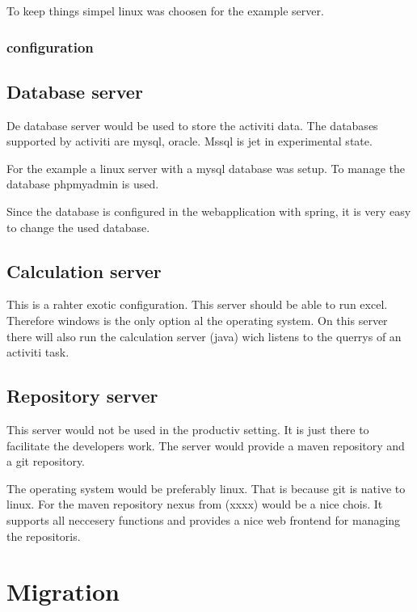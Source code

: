 \documentclass[paper=a4,twoside=false,BCOR=0mm,DIV=calc,fontsize=12pt]{scrartcl}
\begin{document}
To keep things simpel linux was choosen for the example server.

\subsubsection{configuration}


\subsection{Database server}
De database server would be used to store the activiti data. The databases supported by activiti are mysql, oracle. Mssql is jet in experimental state.
 
For the example a linux server with a mysql database was setup.
To manage the database phpmyadmin is used.

Since the database is configured in the webapplication with spring, it is very easy to change the used database.


\subsection{Calculation server}
This is a rahter exotic configuration. This server should be able to run excel. Therefore windows is the only option al the operating system. On this server there will also run the calculation server (java) wich listens to the querrys of an activiti task.



\subsection{Repository server}
This server would not be used in the productiv setting. It is just there to facilitate the developers work.
The server would provide a maven repository and a git repository. 

The operating system would be preferably linux. That is because git is native to linux.
For the maven repository nexus from (xxxx) would be a nice chois. It supports all neccesery functions and provides a nice web frontend for managing the repositoris.







\section{Migration}
\end{document}
